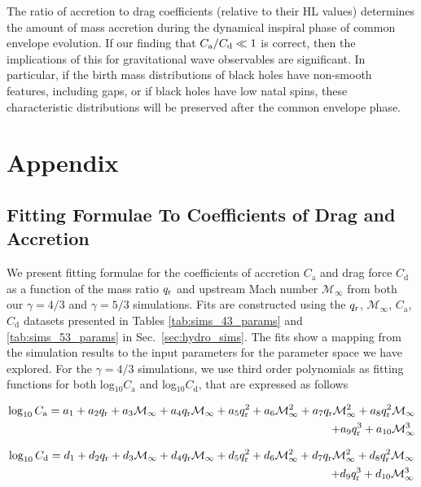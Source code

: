 The ratio of accretion to drag coefficients (relative to their HL values) determines the amount of mass accretion during the dynamical inspiral phase of common envelope evolution. If our finding that $C_{\rm a}/C_{\rm d} \ll 1$ is correct, then the implications of this for gravitational wave observables are significant. In particular, if the birth mass distributions of black holes have non-smooth features, including gaps, or if black holes have low natal spins, these characteristic distributions will be preserved after the common envelope phase.


\clearpage
\section{Appendix}
\subsection{Fitting Formulae To Coefficients of Drag and Accretion}\label{subsec:fits}
We present fitting formulae for the coefficients of accretion $C_{\mathrm a}$ and drag force $C_{\mathrm d}$ as a function of the mass ratio $q_{\rm r}$ and upstream Mach number $\mathcal{M}_\infty$ from both our $\gamma = 4/3$ and $\gamma = 5/3$ simulations. Fits are constructed using the $q_{\rm r}$, $\mathcal{M}_\infty$, $C_{\mathrm a}$, $C_{\mathrm d}$ datasets presented in Tables \ref{tab:sims_43_params} and \ref{tab:sims_53_params} in Sec.~\ref{sec:hydro_sims}. The fits show a mapping from the simulation results to the input parameters for the parameter space we have explored. For the $\gamma = 4/3$ simulations, we use third order polynomials as fitting functions for both log$_{10}C_{\mathrm a}$ and log$_{10}C_{\mathrm d}$, that are  expressed as follows

\begin{equation}
\label{eq:logmdot_g43}
\begin{split}
\log_{10} C_{\mathrm a} = a_1 + a_2 q_{\rm r} + a_3\mathcal{M}_\infty + a_4 q_{\rm r}\mathcal{M}_\infty
+ a_5 q_{\rm r}^2 + a_6 \mathcal{M}_\infty^2 
+ a_7 q_{\rm r} \mathcal{M}_\infty^2 + a_8 q_{\rm r}^2\mathcal{M}_\infty \\ + a_9 q_{\rm r}^3 + a_{10} \mathcal{M}_\infty^3
\end{split}
\end{equation}

\begin{equation}
\label{eq:logdrag_g43}
\begin{split}
\log_{10} C_{\mathrm d} = d_1 + d_2 q_{\rm r} + d_3 \mathcal{M}_\infty + d_4 q_{\rm r}\mathcal{M}_\infty + d_5 q_{\rm r}^2 + d_6 \mathcal{M}_\infty^2
+ d_7 q_{\rm r}\mathcal{M}_\infty^2 + d_8 q_{\rm r}^2\mathcal{M}_\infty \\ + d_9 q_{\rm r}^3 + d_{10} \mathcal{M}_\infty^3
\end{split}
\end{equation}
                

